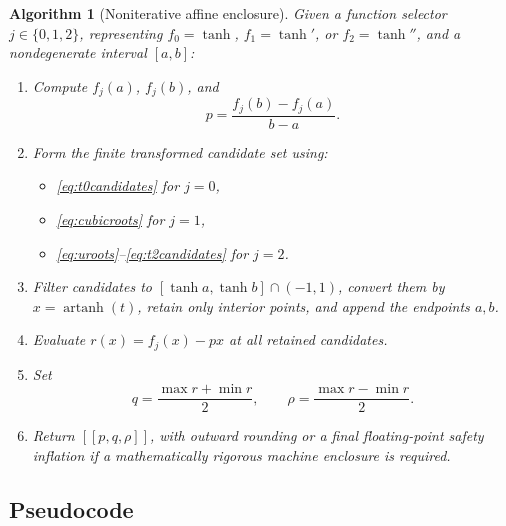 \documentclass[11pt]{article}
\newtheorem{algorithm}{Algorithm}
\newcommand{\artanh}{\operatorname{artanh}}
\begin{document}
\begin{algorithm}[Noniterative affine enclosure]\label{alg:unified}
Given a function selector \(j\in\{0,1,2\}\), representing \(f_0=\tanh\), \(f_1=\tanh'\), or \(f_2=\tanh''\), and a nondegenerate interval \([a,b]\):
\begin{enumerate}[label=\arabic*.,leftmargin=2em]
  \item Compute \(f_j(a)\), \(f_j(b)\), and
  \[
    p=\frac{f_j(b)-f_j(a)}{b-a}.
  \]
  \item Form the finite transformed candidate set using:
  \begin{itemize}
    \item \eqref{eq:t0candidates} for \(j=0\),
    \item \eqref{eq:cubicroots} for \(j=1\),
    \item \eqref{eq:uroots}--\eqref{eq:t2candidates} for \(j=2\).
  \end{itemize}
  \item Filter candidates to \([\tanh a,\tanh b]\cap(-1,1)\), convert them by \(x=\artanh(t)\), retain only interior points, and append the endpoints \(a,b\).
  \item Evaluate \(r(x)=f_j(x)-px\) at all retained candidates.
  \item Set
  \[
    q=\frac{\max r+\min r}{2},
    \qquad
    \rho=\frac{\max r-\min r}{2}.
  \]
  \item Return \([[p,q,\rho]]\), with outward rounding or a final floating-point safety inflation if a mathematically rigorous machine enclosure is required.
\end{enumerate}
\end{algorithm}

\subsection{Pseudocode}
\end{document}
